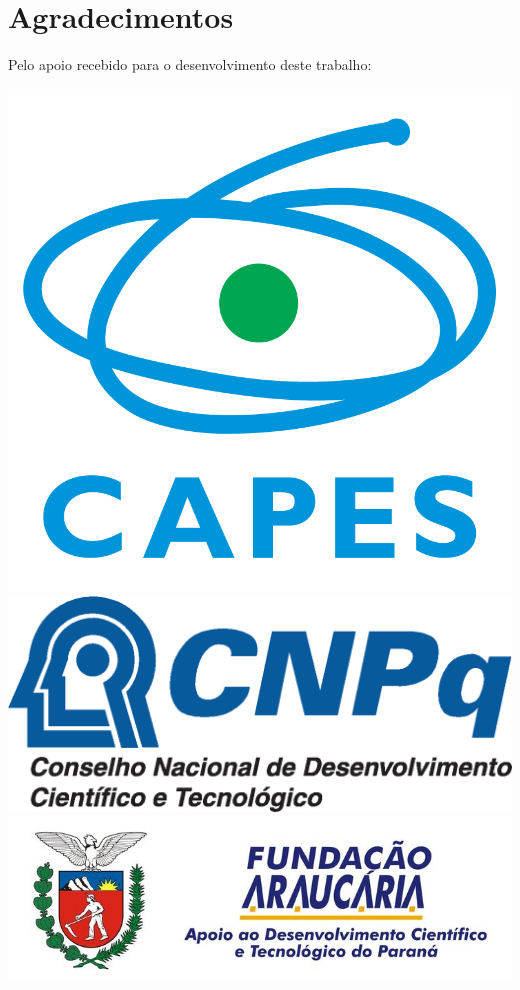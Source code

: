 \documentclass[%
  xcolor=table,%
  10pt,%
  aspectratio = 169,%
  compress,%
  t,%
]{beamer}%
\begin{document}
\section*{Agradecimentos}\label{sec:agrad}

\begin{frame}[c]{}{}
Pelo apoio recebido para o desenvolvimento deste trabalho:
\begin{center}
\includegraphics[height = \logoheight]{./Logos/logo-capes}
\hfill
\includegraphics[height = \logoheight]{./Logos/logo-cnpq}
\hfill
\includegraphics[height = \logoheight]{./Logos/logo-fa}

\end{center}
\end{frame}
\end{document}
